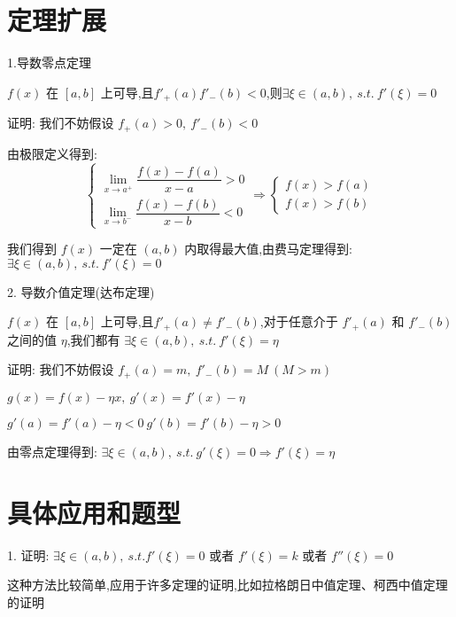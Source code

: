 \section{定理扩展}
\begin{theorem}
	1.导数零点定理

	$f(x)$ 在 $[a,b]$ 上可导,且$f'_{+}(a)f'_{-}(b)<0$,则$\exists \xi\in(a,b),\ s.t.\ f'(\xi)=0$

	证明: 我们不妨假设 $f_{+}(a)>0,\ f'_{-}(b)<0$

	由极限定义得到:
	$$\left\lbrace
		\begin{array}{l}
			\lim\limits_{x\rightarrow a^{+}}\dfrac{f(x)-f(a)}{x-a}>0 \\
			\lim\limits_{x\rightarrow b^{-}}\dfrac{f(x)-f(b)}{x-b}<0
		\end{array}
		\right. \Rightarrow
		\left\lbrace
		\begin{array}{l}
			f(x)>f(a) \\
			f(x)>f(b)
		\end{array}
		\right. $$

	我们得到 $f(x)$ 一定在 $(a,b)$ 内取得最大值,由费马定理得到: $\exists \xi\in(a,b),\ s.t.\ f'(\xi)=0$

	2. 导数介值定理(达布定理)

	$f(x)$ 在 $[a,b]$ 上可导,且$f'_{+}(a)\neq f'_{-}(b)$,对于任意介于 $f'_{+}(a)$ 和 $f'_{-}(b)$ 之间的值 $\eta$,我们都有 $\exists \xi\in(a,b),\ s.t.\ f'(\xi)=\eta$

	证明: 我们不妨假设 $f_{+}(a)=m,\ f'_{-}(b)=M\ (M>m)$

	$g(x)=f(x)-\eta x,\ g'(x)=f'(x)-\eta$

	$g'(a)=f'(a)-\eta<0\ g'(b)=f'(b)-\eta>0$

	由零点定理得到: $\exists \xi\in(a,b),\ s.t.\ g'(\xi)=0\Rightarrow  f'(\xi)=\eta$
\end{theorem}
\section{具体应用和题型}

1. 证明: $\exists \xi\in(a,b),\ s.t. f'(\xi)=0$ 或者 $f'(\xi)=k$ 或者 $f''(\xi)=0$
\begin{anymark}[注]
	这种方法比较简单,应用于许多定理的证明,比如拉格朗日中值定理、柯西中值定理的证明
\end{anymark}


